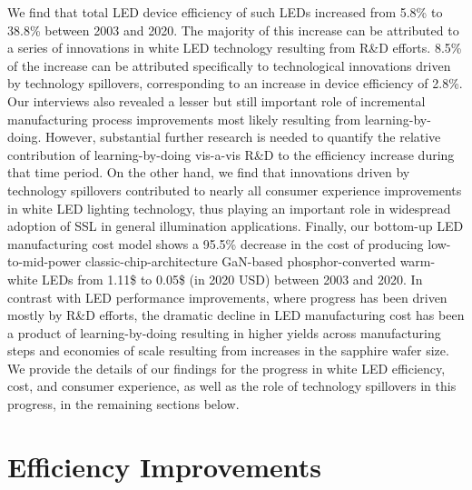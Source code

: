 \documentclass[parskip=full]{article}
\begin{document}
We find that total LED device efficiency of such LEDs increased from 5.8\% to 38.8\% between 2003 and 2020. The majority of this increase can be attributed to a series of innovations in white LED technology resulting from R\&D efforts. 8.5\% of the increase can be attributed specifically to technological innovations driven by technology spillovers, corresponding to an increase in device efficiency of 2.8\%. Our interviews also revealed a lesser but still important role of incremental manufacturing process improvements most likely resulting from learning-by-doing. However, substantial further research is needed to quantify the relative contribution of learning-by-doing vis-a-vis R\&D to the efficiency increase during that time period. On the other hand, we find that innovations driven by technology spillovers contributed to nearly all consumer experience improvements in white LED lighting technology, thus playing an important role in widespread adoption of SSL in general illumination applications. Finally, our bottom-up LED manufacturing cost model shows a 95.5\% decrease in the cost of producing low-to-mid-power classic-chip-architecture GaN-based phosphor-converted warm-white LEDs from 1.11\$ to 0.05\$ (in 2020 USD) between 2003 and 2020. In contrast with LED performance improvements, where progress has been driven mostly by R\&D efforts, the dramatic decline in LED manufacturing cost has been a product of learning-by-doing resulting in higher yields across manufacturing steps and economies of scale resulting from increases in the sapphire wafer size. We provide the details of our findings for the progress in white LED efficiency, cost, and consumer experience, as well as the role of technology spillovers in this progress, in the remaining sections below. 


\clearpage

\section{Efficiency Improvements}
\end{document}
